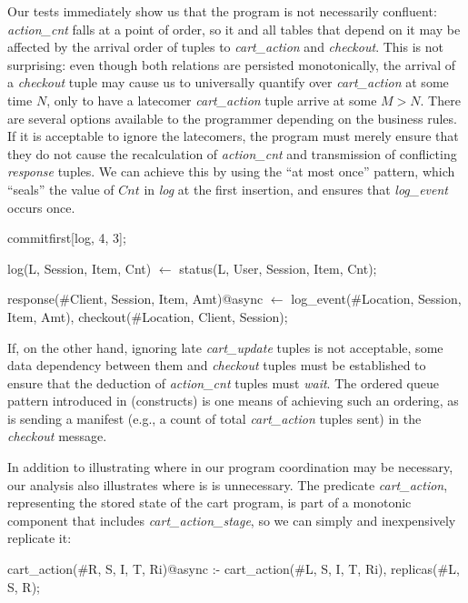 Our tests immediately show us that the program is not necessarily confluent: 
{\em action\_cnt} falls at a point of order,
 so it and all tables that
depend on it may be affected by the arrival order of tuples to {\em cart\_action} and
{\em checkout}.  This is not surprising: even though both relations are persisted monotonically,
the arrival of a {\em checkout} tuple may cause us to universally quantify over {\em cart\_action}
at some time $N$, only to have a latecomer {\em cart\_action} tuple arrive at some $M > N$.
There are several options available to the programmer depending on the business rules.
If it is acceptable to ignore the latecomers, the program must merely ensure that they do not 
cause the recalculation of {\em action\_cnt} and transmission of conflicting {\em response} 
tuples.  We can achieve this by using the ``at most once'' pattern, which ``seals'' the value
of $Cnt$ in {\em log} at the first insertion, and ensures that {\em log\_event} occurs once.
\begin{Dedalus}
commitfirst[log, 4, 3];

log(L, Session, Item, Cnt) \(\leftarrow\) 
    status(L, User, Session, Item, Cnt);

response(#Client, Session, Item, Amt)@async \(\leftarrow\)
    log_event(#Location, Session, Item, Amt),
    checkout(#Location, Client, Session);
\end{Dedalus}


If, on the other hand, ignoring late {\em cart\_update} tuples is not acceptable,
some data dependency between them and {\em checkout} tuples must be established
to ensure that the deduction of {\em action\_cnt} tuples must {\em wait}.  
The ordered queue pattern introduced in (constructs) is one means of achieving such an 
ordering, as is sending a manifest (e.g., a count of total {\em cart\_action} tuples
sent) in the {\em checkout} message.

In addition to illustrating where in our program coordination may be necessary, our
analysis also illustrates where is is unnecessary.
The predicate {\em cart\_action}, representing the stored state 
of the cart program, is part of a monotonic component that includes {\em cart\_action\_stage}, 
so we can simply and inexpensively replicate it:

\begin{Dedalus}
cart_action(#R, S, I, T, Ri)@async :-
    cart_action(#L, S, I, T, Ri),
    replicas(#L, S, R);
\end{Dedalus}

